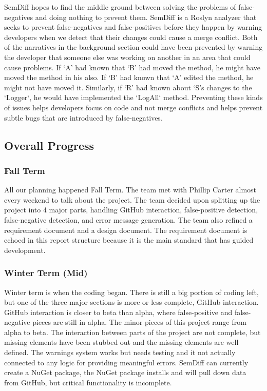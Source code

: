 \documentclass[10pt,draftclsnofoot,onecolumn]{IEEEtran}
\begin{document}
SemDiff hopes to find the middle ground between solving the problems of false-negatives and doing nothing to prevent them. SemDiff is a Roslyn analyzer that seeks to prevent false-negatives and false-positives before they happen by warning developers when we detect that their changes could cause a merge conflict. Both of the narratives in the background section could have been prevented by warning the developer that someone else was working on another in an area that could cause problems. If ‘A’ had known that ‘B’ had moved the method, he might have moved the method in his also. If ‘B’ had known that ‘A’ edited the method, he might not have moved it. Similarly, if ‘R’ had known about ‘S’s changes to the `Logger`, he would have implemented the `LogAll` method. Preventing these kinds of issues helps developers focus on code and not merge conflicts and helps prevent subtle bugs that are introduced by false-negatives.

\subsection{Overall Progress}
\subsubsection{Fall Term}
All our planning happened Fall Term. The team met with Phillip Carter almost every weekend to talk about the project. The team decided upon splitting up the project into 4 major parts, handling GitHub interaction, false-positive detection, false-negative detection, and error message generation. The team also refined a requirement document and a design document. The requirement document is echoed in this report structure because it is the main standard that has guided development.

\subsubsection{Winter Term (Mid)}
Winter term is when the coding began. There is still a big portion of coding left, but one of the three major sections is more or less complete, GitHub interaction. GitHub interaction is closer to beta than alpha, where false-positive and false-negative pieces are still in alpha. The minor pieces of this project range from alpha to beta. The interaction between parts of the project are not complete, but missing elements have been stubbed out and the missing elements are well defined. The warnings system works but needs testing and it not actually connected to any logic for providing meaningful errors. SemDiff can currently create a NuGet package, the NuGet package installs and will pull down data from GitHub, but critical functionality is incomplete.
\end{document}
